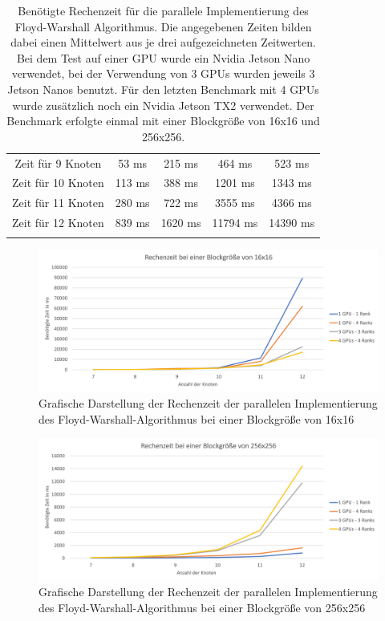 \documentclass[doktyp=semarbeit, sprache=german]{TUBAFarbeiten}
\begin{document}
\begin{table}[]
{\begin{tabular}{@{}ccccc@{}}
\multicolumn{1}{c|}{Zeit für 9 Knoten}  & 53 ms          & 215 ms          & 464 ms           & 523 ms           \\
\multicolumn{1}{c|}{Zeit für 10 Knoten} & 113 ms         & 388 ms          & 1201 ms          & 1343 ms          \\
\multicolumn{1}{c|}{Zeit für 11 Knoten} & 280 ms         & 722 ms          & 3555 ms          & 4366 ms          \\
\multicolumn{1}{c|}{Zeit für 12 Knoten} & 839 ms         & 1620 ms         & 11794 ms         & 14390 ms         \\ \midrule
\multicolumn{5}{l}{}                                                                                            
\end{tabular}%
}
\caption{Benötigte Rechenzeit für die parallele Implementierung des Floyd-Warshall Algorithmus. Die angegebenen Zeiten bilden dabei einen Mittelwert aus je drei aufgezeichneten Zeitwerten. Bei dem Test auf einer GPU wurde ein Nvidia Jetson Nano verwendet, bei der Verwendung von 3 GPUs wurden jeweils 3 Jetson Nanos benutzt. Für den letzten Benchmark mit 4 GPUs wurde zusätzlich noch ein Nvidia Jetson TX2 verwendet. Der Benchmark erfolgte einmal mit einer Blockgröße von 16x16 und 256x256.}
\label{tab:parallelfloyd}
\end{table}
\begin{figure}[H]
	\centering
	\captionsetup{justification=centering} 
	\includegraphics[width=1.0\textwidth]{images/Diagramm2.png}
	\caption{Grafische Darstellung der Rechenzeit der parallelen Implementierung des Floyd-Warshall-Algorithmus bei einer Blockgröße von 16x16}
	\label{img:dia1}
\end{figure}
\begin{figure}[H]
	\centering
	\captionsetup{justification=centering} 
	\includegraphics[width=1.0\textwidth]{images/Diagramm1.png}
	\caption{Grafische Darstellung der Rechenzeit der parallelen Implementierung des Floyd-Warshall-Algorithmus bei einer Blockgröße von 256x256}
	\label{img:dia2}
\end{figure}
\end{document}
